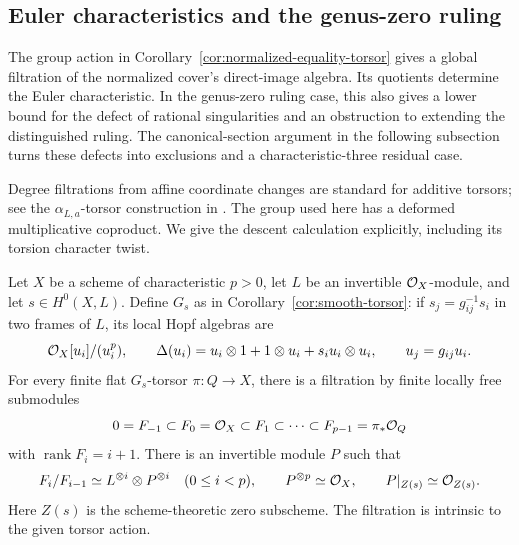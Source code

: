 \subsection{Euler characteristics and the genus-zero ruling}
\label{subsec:equality-torsor-euler}

The group action in Corollary~\ref{cor:normalized-equality-torsor}
gives a global filtration of the normalized cover's direct-image algebra.
Its quotients determine the Euler characteristic. In the genus-zero
ruling case, this also gives a lower bound for the defect of rational
singularities and an obstruction to extending the distinguished ruling.
The canonical-section argument in the following subsection turns these
defects into exclusions and a characteristic-three residual case.

Degree filtrations from affine coordinate changes are standard for
additive torsors; see the $\alpha_{L,a}$-torsor construction in
\cite[equation~(0.2.17), pp.~38--40]{CDL}. The group used here has a
deformed multiplicative coproduct. We give the descent calculation
explicitly, including its torsion character twist.

\begin{proposition}\label{prop:deformed-torsor-degree-filtration}
Let $X$ be a scheme of characteristic $p>0$, let $L$ be an invertible
$\mathcal O_X$-module, and let $s\in H^0(X,L)$. Define $G_s$ as in
Corollary~\ref{cor:smooth-torsor}: if $s_j=g_{ij}^{-1}s_i$ in two
frames of $L$, its local Hopf algebras are
\[
 \mathcal O_X[u_i]/(u_i^p),\qquad
 \Delta(u_i)=u_i\otimes1+1\otimes u_i+s_i u_i\otimes u_i,
 \qquad u_j=g_{ij}u_i.
\]
For every finite flat $G_s$-torsor $\pi:Q\to X$, there is a filtration
by finite locally free submodules
\[
 0=F_{-1}\subset F_0=\mathcal O_X\subset F_1\subset\cdots
 \subset F_{p-1}=\pi_*\mathcal O_Q
\]
with $\operatorname{rank}F_i=i+1$. There is an invertible module $P$ such
that
\begin{equation}\label{eq:deformed-torsor-graded}
 F_i/F_{i-1}\simeq L^{\otimes i}\otimes P^{\otimes i}
 \quad(0\leq i<p),\qquad
 P^{\otimes p}\simeq\mathcal O_X,\qquad
 P|_{Z(s)}\simeq\mathcal O_{Z(s)}.
\end{equation}
Here $Z(s)$ is the scheme-theoretic zero subscheme.
The filtration is intrinsic to the given torsor action.
\end{proposition}

